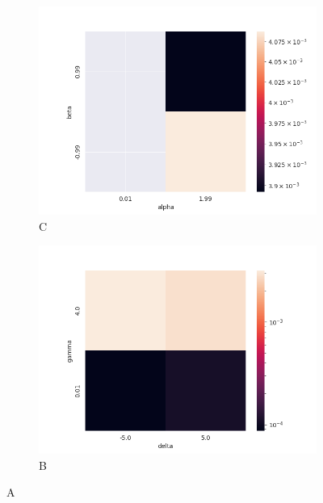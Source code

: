\documentclass{article}
\begin{document}
		\begin{figure}[H]
			\begin{subfigure}{.5\textwidth}
				\centering
				\includegraphics[width=1\linewidth]{images/heatmap_cf_MAE_alpha_beta.png}
				\caption{C}
			\end{subfigure}
			\begin{subfigure}[r]{.5\textwidth}
				\centering
				\includegraphics[width=1\linewidth]{images/heatmap_cf_MAE_gamma_delta.png}
				\caption{B}
			\end{subfigure}
			\caption{A}
		\end{figure}
		
\end{document}
